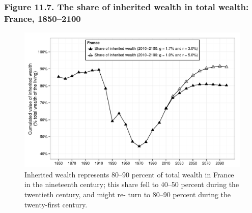\documentclass[t]{beamer}\usepackage[]{graphicx}\usepackage[]{color}
\newenvironment{knitrout}{}{} %
\begin{document}
\begin{frame}[label=Figure_11_7]
\frametitle{Figure 11.7. The share of inherited wealth in total wealth: France, 1850--2100}
\begin{figure}[t]
\begin{minipage}[b]{\textwidth}
\centering
\begin{knitrout}\footnotesize
{}\color{fgcolor}

{\centering \includegraphics[width=1\linewidth]{figures/bw/Figure_11_7} 

}



\end{knitrout}
\caption{Inherited wealth represents 80--90 percent of total wealth in France in the nineteenth century; this share fell to 40--50 percent during the twentieth century, and might re- turn to 80--90 percent during the twenty-first century.}
\end{minipage}
\end{figure}
\end{frame}
\end{document}
